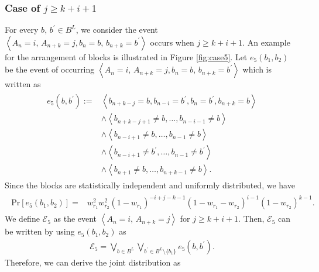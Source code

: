 \documentclass[dvipdfmx,english]{ampmt} %
\begin{document}
\subsubsection{Case of $j \geq k+i+1$}
For every $b,\, b^\prime \in B^L$, we consider the event $\left< A_n=i ,\, A_{n+k}=j,b_n=b,\,b_{n+k}=b^\prime\right>$ occurs when $j \geq k+i+1$. An example for the arrangement of blocks is illustrated in Figure \ref{fig:case5}. Let $e_5(b_1,b_2)$ be the event of occurring $\left< A_n=i ,\, A_{n+k}=j,b_n=b,\,b_{n+k}=b^\prime\right>$ which is written as
\begin{align}
\begin{split}
  \label{eq:e_5}
  e_5 (b,b^\prime) := 
  &\left< b_{n+k-j} = b , b_{n-i} = b^\prime , b_{n} = b^\prime , b_{n+k} = b \right> \\
  &\land \left< b_{n+k-j+1} \neq b, \dots, b_{n-i-1} \neq b \right> \\
  &\land \left< b_{n-i+1} \neq b, \dots, b_{n-1} \neq b \right> \\
  &\land \left< b_{n-i+1} \neq b^\prime, \dots, b_{n-1} \neq b^\prime \right> \\
  &\land \left< b_{n+1} \neq b , \dots, b_{n+k-1} \neq b \right>.
\end{split}
\end{align}
Since the blocks are statistically independent and uniformly distributed, we have
\begin{align}
\begin{split}
  \label{eq:probability_e5}
  \mathrm{Pr} \left[ e_5(b_1,b_2) \right] 
  =& w_{r_1}^2  w_{r_2}^2 
  (1-w_{r_1})^{-i+j-k-1} 
  (1-w_{r_1}-w_{r_2})^{i-1}
  (1-w_{r_2})^{k-1}. 
\end{split}
\end{align}
We define $\mathcal{E}_5$ as the event $\left< A_n=i ,\, A_{n+k}=j\right>$ for $j \geq k+i+1$. Then, $\mathcal{E}_5$ can be written by using $e_5(b_1,b_2)$ as
\begin{align}\label{eq:E_5}
  \mathcal{E}_5 = \bigvee_{b \in B^L} \bigvee_{b^\prime \in B^L \setminus \{b_1\}} e_5(b,b^\prime).
\end{align}
%
Therefore, we can derive the joint distribution as
\end{document}
